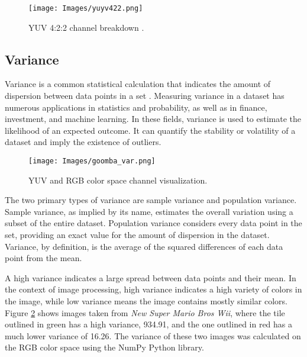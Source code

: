 \documentclass{article}
\begin{document}
    \begin{figure}[!tb] 
        \centering
        \texttt{[image: Images/yuyv422.png]} 
        \caption{YUV 4:2:2 channel breakdown \cite{pai_understanding_2024}.} 
        \label{fig:yuyv_422} 
    \end{figure}

    \subsection{Variance}
    \noindent Variance is a common statistical calculation that indicates the amount of dispersion between data points in a set \cite{wut_is_variance}. Measuring variance in a dataset has numerous applications in statistics and probability, as well as in finance, investment, and machine learning. In these fields, variance is used to estimate the likelihood of an expected outcome. It can quantify the stability or volatility of a dataset and imply the existence of outliers. 

    \begin{figure}[!tb] 
        \centering
        \texttt{[image: Images/goomba\_var.png]} 
        \caption{YUV and RGB color space channel visualization.} 
        \label{fig:goomba_var} 
    \end{figure}
    \par The two primary types of variance are sample variance and population variance. Sample variance, as implied by its name, estimates the overall variation using a subset of the entire dataset. Population variance considers every data point in the set, providing an exact value for the amount of dispersion in the dataset. Variance, by definition, is the average of the squared differences of each data point from the mean. 

    \par A high variance indicates a large spread between data points and their mean. In the context of image processing, high variance indicates a high variety of colors in the image, while low variance means the image contains mostly similar colors. Figure \ref{fig:goomba_var} shows images taken from \textit{New Super Mario Bros Wii}, where the tile outlined in green has a high variance, 934.91, and the one outlined in red has a much lower variance of 16.26. The variance of these two images was calculated on the RGB color space using the NumPy Python library. 
    
\end{document}
